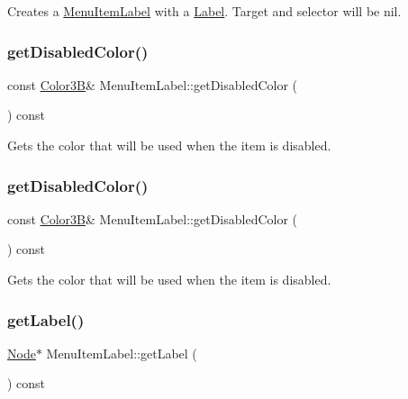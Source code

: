 Creates a \hyperlink{classMenuItemLabel}{Menu\+Item\+Label} with a \hyperlink{classLabel}{Label}. Target and selector will be nil. \mbox{\label{classMenuItemLabel_acebe3d1c892af9ca9b8c495211160790}} 
\subsubsection{\texorpdfstring{get\+Disabled\+Color()}{getDisabledColor()}\hspace{0.1cm}{\footnotesize\ttfamily [1/2]}}
{\footnotesize\ttfamily const \hyperlink{structColor3B}{Color3B}\& Menu\+Item\+Label\+::get\+Disabled\+Color (\begin{DoxyParamCaption}{ }\end{DoxyParamCaption}) const\hspace{0.3cm}{\ttfamily [inline]}}

Gets the color that will be used when the item is disabled. \mbox{\label{classMenuItemLabel_acebe3d1c892af9ca9b8c495211160790}} 
\subsubsection{\texorpdfstring{get\+Disabled\+Color()}{getDisabledColor()}\hspace{0.1cm}{\footnotesize\ttfamily [2/2]}}
{\footnotesize\ttfamily const \hyperlink{structColor3B}{Color3B}\& Menu\+Item\+Label\+::get\+Disabled\+Color (\begin{DoxyParamCaption}{ }\end{DoxyParamCaption}) const\hspace{0.3cm}{\ttfamily [inline]}}

Gets the color that will be used when the item is disabled. \mbox{\label{classMenuItemLabel_a4e54f5c99e05377f183c6b8f3aec1f55}} 
\subsubsection{\texorpdfstring{get\+Label()}{getLabel()}\hspace{0.1cm}{\footnotesize\ttfamily [1/2]}}
{\footnotesize\ttfamily \hyperlink{classNode}{Node}$\ast$ Menu\+Item\+Label\+::get\+Label (\begin{DoxyParamCaption}{ }\end{DoxyParamCaption}) const\hspace{0.3cm}{\ttfamily [inline]}}

